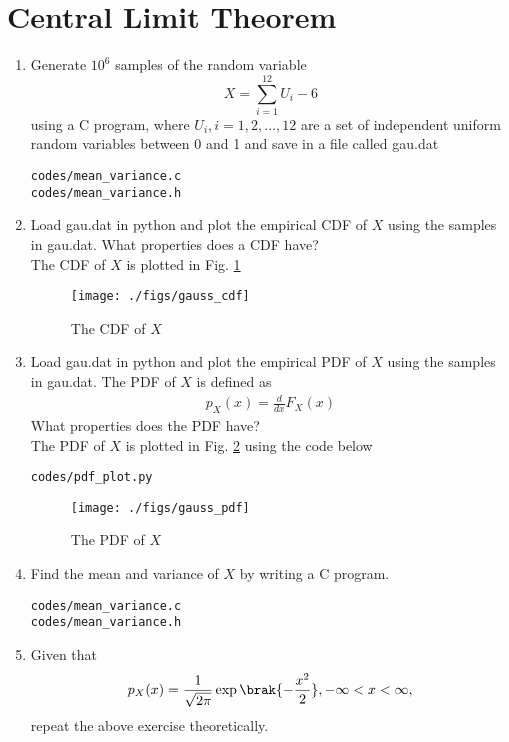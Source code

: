 \documentclass[journal,12pt,twocolumn]{IEEEtran}
\renewcommand\thesection{\arabic{section}}
\begin{document}
\section{Central Limit Theorem}
%
\begin{enumerate}[label=\thesection.\arabic*
,ref=\thesection.\theenumi]

%
\item
Generate $10^6$ samples of the random variable
%
\begin{equation}
X = \sum_{i=1}^{12}U_i -6
\end{equation}
%
using a C program, where $U_i, i = 1,2,\dots, 12$ are  a set of independent uniform random variables between 0 and 1
and save in a file called gau.dat
\solution
\begin{lstlisting}
codes/mean_variance.c
codes/mean_variance.h
\end{lstlisting}

%
\item
Load gau.dat in python and plot the empirical CDF of $X$ using the samples in gau.dat. What properties does a CDF have?
\\
\solution The CDF of $X$ is plotted in Fig. \ref{fig:gauss_cdf}
\begin{figure}
\centering
\texttt{[image: ./figs/gauss\_cdf]}
\caption{The CDF of $X$}
\label{fig:gauss_cdf}
\end{figure}
\item
Load gau.dat in python and plot the empirical PDF of $X$ using the samples in gau.dat. The PDF of $X$ is defined as
\begin{align}
p_{X}(x) = \frac{d}{dx}F_{X}(x)
\end{align}
What properties does the PDF have?
\\
\solution The PDF of $X$ is plotted in Fig. \ref{fig:gauss_pdf} using the code below
\begin{lstlisting}
codes/pdf_plot.py
\end{lstlisting}

\begin{figure}
\centering
\texttt{[image: ./figs/gauss\_pdf]}
\caption{The PDF of $X$}
\label{fig:gauss_pdf}
\end{figure}

\item Find the mean and variance of $X$ by writing a C program.
\solution
\begin{lstlisting}
codes/mean_variance.c
codes/mean_variance.h
\end{lstlisting}
\item Given that 
\begin{align}
p_{X}(x) = \frac{1}{\sqrt{2\pi}}\exp\brak{-\frac{x^2}{2}}, -\infty < x < \infty,
\end{align}
repeat the above exercise theoretically.
%
\end{enumerate}
\end{document}
